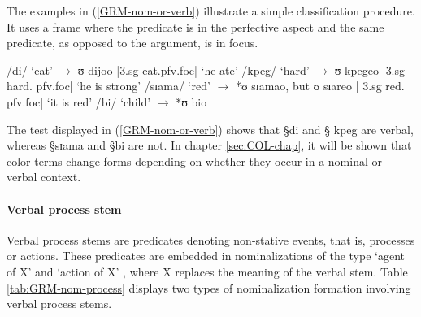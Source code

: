 The examples in
(\ref{GRM-nom-or-verb}) illustrate a simple classification procedure. It uses a
frame where the predicate is in the 
perfective aspect and  the same 
predicate, as opposed to the argument,  is in focus.

\begin{exe}
 \ex\label{GRM-nom-or-verb}
 \begin{xlist}
\ex /di/  `eat' $\rightarrow$ {\I ʊ  dijoo} |{\sc 3.sg} eat.{\sc pfv.foc}| `he
ate'
  \ex /kpeg/  `hard' $\rightarrow$ {\I ʊ kpegeo}  |{\sc 3.sg} hard.{\sc
pfv.foc}| `he is strong'
   \ex /sɪama/  `red' $\rightarrow$ *{\I ʊ sɪamao}, but   {\I ʊ sɪareo}   |{\sc
3.sg} red.{\sc
pfv.foc}|  `it is
red'
   \ex /bi/  `child' $\rightarrow$  *{\I ʊ bio} 
 \end{xlist}

\end{exe}


The test displayed in (\ref{GRM-nom-or-verb}) shows that  {\S di} and  {\S
kpeg} are verbal,  whereas {\S sɪama} and {\S bi} are not. In
chapter \ref{sec:COL-chap}, it will be shown that color terms change forms
depending on whether
they occur  in a nominal or verbal context.  


\paragraph{Verbal process stem}
\label{sec:GRM-verb-act-stem}


Verbal process stems are predicates denoting non-stative events, that is,
processes or actions. These predicates are embedded in  nominalizations of the
type `agent of X' and `action of X' , where X replaces the meaning of the
verbal stem. Table \ref{tab:GRM-nom-process} displays  two types of
nominalization
formation  involving verbal process stems. 

